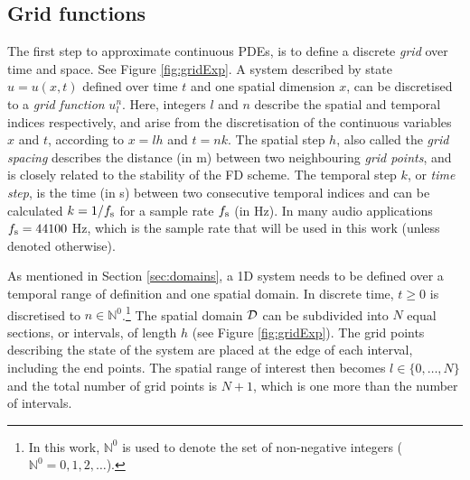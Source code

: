 \subsection{Grid functions } \label{sec:gridFunctions}
The first step to approximate continuous PDEs, is to define a discrete \textit{grid} over time and space. See Figure \ref{fig:gridExp}. A system described by state $u = u(x,t)$ defined over time $t$ and one spatial dimension $x$, can be discretised to a \textit{grid function} $u_l^n$. Here, integers $l$ and $n$ describe the spatial and temporal indices respectively, and arise from the discretisation of the continuous variables $x$ and $t$, according to $x=lh$ and $t=nk$. The spatial step $h$, also called the \textit{grid spacing} describes the distance (in m) between two neighbouring \textit{grid points}, and is closely related to the stability of the FD scheme. The temporal step $k$, or \textit{time step}, is the time (in s) between two consecutive temporal indices and can be calculated $k=1/f_\text{s}$ for a sample rate $f_\text{s}$ (in Hz). In many audio applications $f_\text{s} = 44100$ Hz, which is the sample rate that will be used in this work (unless denoted otherwise).

As mentioned in Section \ref{sec:domains}, a 1D system needs to be defined over a temporal range of definition and one spatial domain.
In discrete time, $t \geq 0$ is discretised to $n \in \mathbb{N}^0$.\footnote{In this work, $\mathbb{N}^0$ is used to denote the set of non-negative integers ($\mathbb{N}^0 = 0, 1, 2, 
\hdots$).} 
The spatial domain $\mathcal{D}$ can be subdivided into $N$ equal sections, or intervals, of length $h$ (see Figure \ref{fig:gridExp}). The grid points describing the state of the system are placed at the edge of each interval, including the end points. The spatial range of interest then becomes $l\in \{0, \hdots, N\}$ and the total number of grid points is $N+1$, which is one more than the number of intervals.




